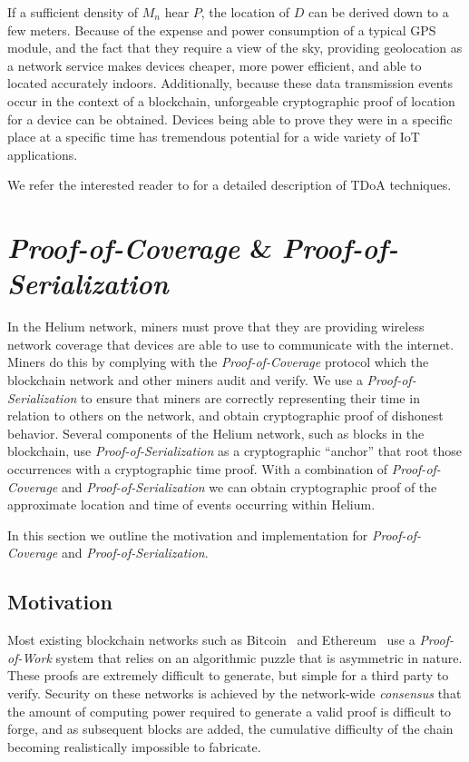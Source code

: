 \documentclass[letterpaper,11pt]{article}
\begin{document}
If a sufficient density of $M_n$ hear $P$, the location of $D$ can be derived down to a few meters. Because of the expense and power consumption of a typical GPS module, and the fact that they require a view of the sky, providing geolocation as a network service makes devices cheaper, more power efficient, and able to located accurately indoors. Additionally, because these data transmission events occur in the context of a blockchain, unforgeable cryptographic proof of location for a device can be obtained. Devices being able to prove they were in a specific place at a specific time has tremendous potential for a wide variety of IoT applications.

We refer the interested reader to\cite{tdoa} for a detailed description of TDoA techniques.

\section{\emph{Proof-of-Coverage} \& \emph{Proof-of-Serialization}}\label{poc}

In the Helium network, miners must prove that they are providing wireless network coverage that devices are able to use to communicate with the internet. Miners do this by complying with the \emph{Proof-of-Coverage} protocol which the blockchain network and other miners audit and verify. We use a \emph{Proof-of-Serialization} to ensure that miners are correctly representing their time in relation to others on the network, and obtain cryptographic proof of dishonest behavior. Several components of the Helium network, such as blocks in the blockchain, use \emph{Proof-of-Serialization} as a cryptographic ``anchor'' that root those occurrences  with a cryptographic time proof. With a combination of \emph{Proof-of-Coverage} and \emph{Proof-of-Serialization} we can obtain cryptographic proof of the approximate location and time of events occurring within Helium.

In this section we outline the motivation and implementation for \emph{Proof-of-Coverage} and \emph{Proof-of-Serialization}.

\subsection{Motivation}

Most existing blockchain networks such as Bitcoin~\cite{bitcoin} and Ethereum~\cite{ethereum} use a \emph{Proof-of-Work} system that relies on an algorithmic puzzle that is asymmetric in nature. These proofs are extremely difficult to generate, but simple for a third party to verify. Security on these networks is achieved by the network-wide \emph{consensus} that the amount of computing power required to generate a valid proof is difficult to forge, and as subsequent blocks are added, the cumulative difficulty of the chain becoming realistically impossible to fabricate.
\end{document}

